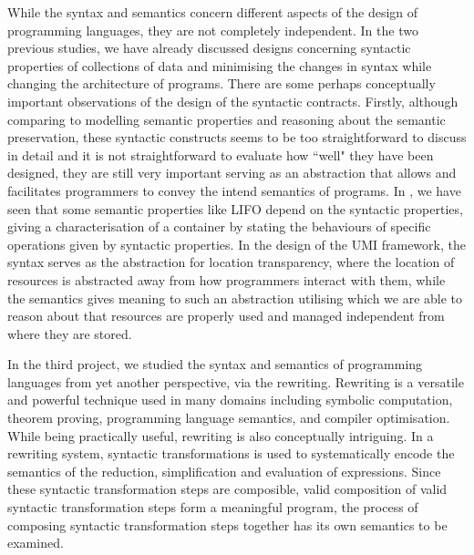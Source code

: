While the syntax and semantics concern different aspects of the design of programming languages, they are not completely independent. In the two previous studies, we have already discussed designs concerning syntactic properties of collections of data and minimising the changes in syntax while changing the architecture of programs. There are some perhaps conceptually important observations of the design of the syntactic contracts. Firstly, although comparing to modelling semantic properties and reasoning about the semantic preservation, these syntactic constructs seems to be too straightforward to discuss in detail and it is not straightforward to evaluate how ``well" they have been designed, they are still very important serving as an abstraction that allows and facilitates programmers to convey the intend semantics of programs. In \Primrose{}, we have seen that some semantic properties like LIFO depend on the syntactic properties, giving a characterisation of a container by stating the behaviours of specific operations given by syntactic properties. In the design of the UMI framework, the syntax serves as the abstraction for location transparency, where the location of resources is abstracted away from how programmers interact with them, while the semantics gives meaning to such an abstraction utilising which we are able to reason about that resources are properly used and managed independent from where they are stored.

In the third project, we studied the syntax and semantics of programming languages from yet another perspective, via the rewriting.
Rewriting is a versatile and powerful technique used in many domains including symbolic computation, theorem proving, programming language semantics, and compiler optimisation.
While being practically useful, rewriting is also conceptually intriguing. In a rewriting system, syntactic transformations is used to systematically encode the semantics of the reduction, simplification and evaluation of expressions. Since these syntactic transformation steps are composible, valid composition of valid syntactic transformation steps form a meaningful program, the process of composing syntactic transformation steps together has its own semantics to be examined. 

